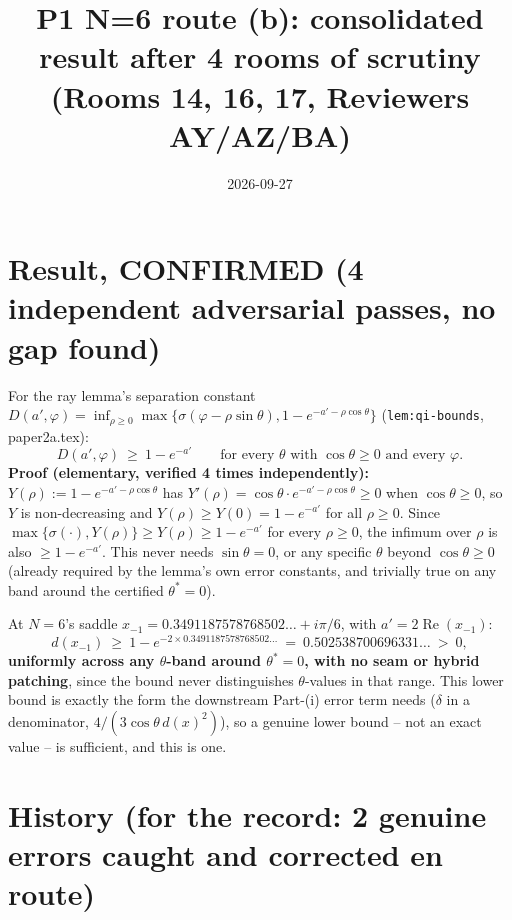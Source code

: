 \documentclass[11pt]{article}
\title{P1 N=6 route (b): consolidated result after 4 rooms of scrutiny (Rooms 14, 16, 17,
Reviewers AY/AZ/BA)}
\date{2026-09-27}
\begin{document}
\maketitle

\section*{Result, CONFIRMED (4 independent adversarial passes, no gap found)}

For the ray lemma's separation constant $D(a',\varphi)=\inf_{\rho\ge0}\max\{\sigma(\varphi-\rho\sin\theta),
1-e^{-a'-\rho\cos\theta}\}$ (\texttt{lem:qi-bounds}, paper2a.tex):
\[
   D(a',\varphi)\ \ge\ 1-e^{-a'}\qquad\text{for every }\theta\text{ with }\cos\theta\ge0\text{ and every }\varphi.
\]
\textbf{Proof (elementary, verified 4 times independently):} $Y(\rho):=1-e^{-a'-\rho\cos\theta}$
has $Y'(\rho)=\cos\theta\cdot e^{-a'-\rho\cos\theta}\ge0$ when $\cos\theta\ge0$, so $Y$ is
non-decreasing and $Y(\rho)\ge Y(0)=1-e^{-a'}$ for all $\rho\ge0$. Since
$\max\{\sigma(\cdot),Y(\rho)\}\ge Y(\rho)\ge1-e^{-a'}$ for every $\rho\ge0$, the infimum over
$\rho$ is also $\ge1-e^{-a'}$. This never needs $\sin\theta=0$, or any specific $\theta$ beyond
$\cos\theta\ge0$ (already required by the lemma's own error constants, and trivially true on any
band around the certified $\theta^\ast=0$).

At $N=6$'s saddle $x_{-1}=0.3491187578768502\ldots+i\pi/6$, with $a'=2\operatorname{Re}(x_{-1})$:
\[
   d(x_{-1})\ \ge\ 1-e^{-2\times0.3491187578768502\ldots}\ =\ 0.502538700696331\ldots\ >\ 0,
\]
\textbf{uniformly across any $\theta$-band around $\theta^\ast=0$, with no seam or hybrid
patching}, since the bound never distinguishes $\theta$-values in that range. This lower bound is
exactly the form the downstream Part-(i) error term needs ($\delta$ in a denominator, $4/(3\cos\theta\,d(x)^2)$),
so a genuine lower bound -- not an exact value -- is sufficient, and this is one.

\section*{History (for the record: 2 genuine errors caught and corrected en route)}
\end{document}
